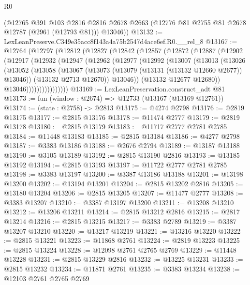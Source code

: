\begin{lexlean}{R0}
\begin{coremodule}
      (@12765
        @391
        @103
        @2816
        @2816
        @2678
        @2663
        (@12776 @81 @2755 @81 @2678 @12787 (@2961 (@12793 @81)))
        @13046))
@13132 := LexLeanPreserve.C349e35acc8f143a4a75b2547d4ace6ef.R0.__rel_8
@13167 := @12764
    (@12797
      (@12812
        (@12827
          (@12842
            (@12857
              (@12872
                (@12887
                  (@12902
                    (@12917
                      (@12932
                        (@12947
                          (@12962
                            (@12977
                              (@12992
                                (@13007
                                  (@13013
                                    (@13026
                                      (@13052
                                        (@13058
                                          (@13067
                                            (@13073 (@13079 (@13131 (@13132 @12660 @2677)) @13046))
                                            (@13132 @2713 @12670))
                                          @13046))
                                      (@13132 @12677 @12680))
                                    @13046))))))))))))))))
@13169 := LexLeanPreservation.construct_adt @81
@13173 := fun (window : @2674) => @12733 (@13167 (@13169 @12761))
@13174 := (state : @2758) -> @2813
@13175 := @4274 @2798
@13176 := @2819 @13175
@13177 := @2815 @13176
@13178 := @11474 @2777
@13179 := @2819 @13178
@13180 := @2815 @13179
@13183 := @11717 @2777 @2781 @2785
@13184 := @11448 @13183
@13185 := @2815 @13184
@13186 := @4277 @2798
@13187 := @3383 @13186
@13188 := @2676 @2794
@13189 := @13187 @13188
@13190 := @3105 @13189
@13192 := @2815 @13190 @2816
@13193 := @13185 @13192
@13194 := @2815 @13193
@13197 := @11722 @2777 @2781 @2785
@13198 := @3383 @13197
@13200 := @3387 @13186 @13188
@13201 := @13198 @13200
@13202 := @13194 @13201
@13204 := @2815 @13202 @2816
@13205 := @13180 @13204
@13206 := @2815 @13205
@13207 := @11477 @2777
@13208 := @3383 @13207
@13210 := @3387 @13197 @13200
@13211 := @13208 @13210
@13212 := @13206 @13211
@13214 := @2815 @13212 @2816
@13215 := @2817 @13214
@13216 := @2815 @13215
@13217 := @3383 @2789
@13219 := @3387 @13207 @13210
@13220 := @13217 @13219
@13221 := @13216 @13220
@13222 := @2815 @13221
@13223 := @11868 @2761
@13224 := @2819 @13223
@13225 := @2815 @13224
@13228 := @12098 @2761 @2765 @2769
@13229 := @11448 @13228
@13231 := @2815 @13229 @2816
@13232 := @13225 @13231
@13233 := @2815 @13232
@13234 := @11871 @2761
@13235 := @3383 @13234
@13238 := @12103 @2761 @2765 @2769

\end{coremodule}
\end{lexlean}
